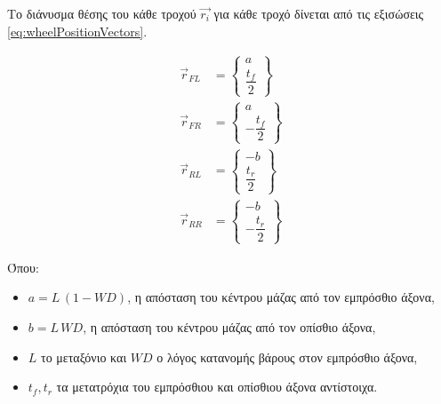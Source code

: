 Το διάνυσμα θέσης του κάθε τροχού $\vec{r_i}$ για κάθε τροχό δίνεται από τις εξισώσεις \ref{eq:wheelPositionVectors}.

\begin{equation}
  \begin{aligned}
    \vec{r}_{FL} &= \begin{Bmatrix} a \\ \dfrac{t_f}{2} \end{Bmatrix}\\[10pt]
    \vec{r}_{FR} &= \begin{Bmatrix} a \\ -\dfrac{t_f}{2} \end{Bmatrix}\\[10pt]
    \vec{r}_{RL} &= \begin{Bmatrix} -b \\ \dfrac{t_r}{2} \end{Bmatrix}\\[10pt]
    \vec{r}_{RR} &= \begin{Bmatrix} -b \\ -\dfrac{t_r}{2} \end{Bmatrix}
  \end{aligned}
  \label{eq:wheelPositionVectors}
\end{equation}

Όπου:
\begin{itemize}
  \item $a = L\,(1-WD)$, η απόσταση του κέντρου μάζας από τον εμπρόσθιο άξονα,
  \item $b = L\,WD$, η απόσταση του κέντρου μάζας από τον οπίσθιο άξονα,
  \item $L$ το μεταξόνιο και $WD$ ο λόγος κατανομής βάρους στον εμπρόσθιο άξονα,
  \item $t_f, t_r$ τα μετατρόχια του εμπρόσθιου και οπίσθιου άξονα αντίστοιχα.
\end{itemize}